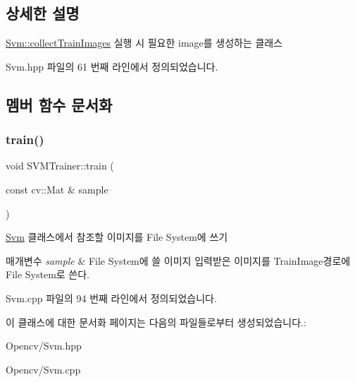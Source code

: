 \subsection{상세한 설명}
\hyperlink{class_svm_a1b18e97fffb268f9cfe91152f7e96298}{Svm\+::collect\+Train\+Images} 실행 시 필요한 image를 생성하는 클래스 

Svm.\+hpp 파일의 61 번째 라인에서 정의되었습니다.



\subsection{멤버 함수 문서화}
\mbox{\label{class_s_v_m_trainer_a60f3eb8020709966c067246c98b610c4}} 
\subsubsection{\texorpdfstring{train()}{train()}}
{\footnotesize\ttfamily void S\+V\+M\+Trainer\+::train (\begin{DoxyParamCaption}\item[{const cv\+::\+Mat \&}]{sample }\end{DoxyParamCaption})}



\hyperlink{class_svm}{Svm} 클래스에서 참조할 이미지를 File System에 쓰기 


\begin{DoxyParams}{매개변수}
{\em sample} & File System에 쓸 이미지 입력받은 이미지를 \textquotesingle{}Train\+Image\textquotesingle{}경로에 File System로 쓴다. \\
\hline
\end{DoxyParams}


Svm.\+cpp 파일의 94 번째 라인에서 정의되었습니다.



이 클래스에 대한 문서화 페이지는 다음의 파일들로부터 생성되었습니다.\+:\begin{DoxyCompactItemize}
\item 
Opencv/Svm.\+hpp\item 
Opencv/Svm.\+cpp\end{DoxyCompactItemize}
